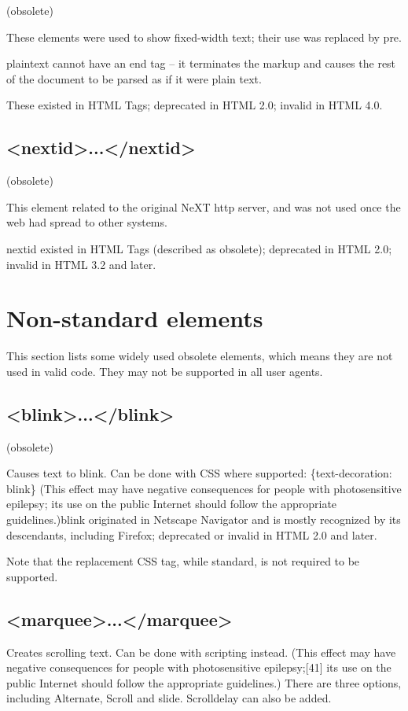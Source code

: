 (obsolete)

These elements were used to show fixed-width text; their use was replaced by pre.

plaintext cannot have an end tag – it terminates the markup and causes the rest of the document to be parsed as if it were plain text.

These existed in HTML Tags; deprecated in HTML 2.0; invalid in HTML 4.0.


\section{<nextid>...</nextid>}

(obsolete)

This element related to the original NeXT http server, and was not used once the web had spread to other systems.

nextid existed in HTML Tags (described as obsolete); deprecated in HTML 2.0; invalid in HTML 3.2 and later.



\chapter{Non-standard elements}

This section lists some widely used obsolete elements, which means they are not used in valid code. They may not be supported in all user agents.

\section{<blink>...</blink>}

(obsolete)

Causes text to blink. Can be done with CSS where supported: \{text-decoration: blink\} (This effect may have negative consequences for people with photosensitive epilepsy; its use on the public Internet should follow the appropriate guidelines.)blink originated in Netscape Navigator and is mostly recognized by its descendants, including Firefox; deprecated or invalid in HTML 2.0 and later. 

Note that the replacement CSS tag, while standard, is not required to be supported.

\section{<marquee>...</marquee>}

Creates scrolling text. Can be done with scripting instead. (This effect may have negative consequences for people with photosensitive epilepsy;[41] its use on the public Internet should follow the appropriate guidelines.) There are three options, including Alternate, Scroll and slide. Scrolldelay can also be added.

